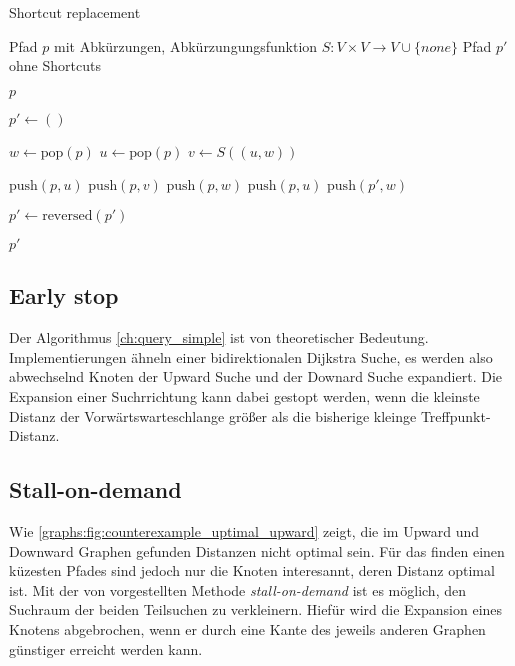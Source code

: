 \begin{algorithm}[ht]
    \caption{Shortcut replacement}
    \begin{algorithmic}[1]
        \Require Pfad $p$ mit Abkürzungen, Abkürzungungsfunktion $S \colon V \times V \to V \cup \{ {none} \}$
        \Ensure Pfad $p'$ ohne Shortcuts

        \State \Return $p$
        \EndIf
        \State

        \State $p' \leftarrow ()$
        \State

        \State $w \leftarrow \text{pop}(p)$
        \State $u \leftarrow \text{pop}(p)$
        \State $v \leftarrow S((u, w))$
        \State

        \State $\text{push}(p, u)$
        \State $\text{push}(p, v)$
        \State $\text{push}(p, w)$
        \Else
        \State $\text{push}(p, u)$
        \State $\text{push}(p', w)$
        \EndIf
        \EndWhile

        \State
        \State $p' \leftarrow \text{reversed}(p')$

        \State
        \State \Return $p'$
    \end{algorithmic}
    \label{ch:alg:shortcut_replacement}
\end{algorithm}

\subsection{Early stop}

Der Algorithmus \ref{ch:query_simple} ist von theoretischer Bedeutung.
Implementierungen ähneln einer bidirektionalen Dijkstra Suche, es werden also abwechselnd Knoten der Upward Suche und der Downard Suche expandiert.
Die Expansion einer Suchrrichtung kann dabei gestopt werden, wenn die kleinste Distanz der Vorwärtswarteschlange größer als die bisherige kleinge Treffpunkt-Distanz.

\subsection{Stall-on-demand}

Wie \autoref{graphs:fig:counterexample_uptimal_upward} zeigt, die im Upward und Downward Graphen gefunden Distanzen nicht optimal sein.
Für das finden einen küzesten Pfades sind jedoch nur die Knoten interesannt, deren Distanz optimal ist.
Mit der von \cite{schultes2007dynamic} vorgestellten Methode \emph{stall-on-demand} ist es möglich, den Suchraum der beiden Teilsuchen zu verkleinern.
Hiefür wird die Expansion eines Knotens abgebrochen, wenn er durch eine Kante des jeweils anderen Graphen günstiger erreicht werden kann.

